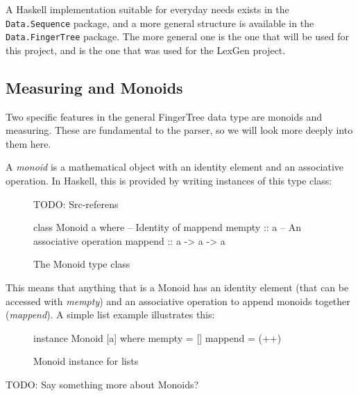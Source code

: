 \documentclass[a4paper,12pt,twosided]{report}
\begin{document}
A Haskell implementation suitable for everyday needs exists in the
\texttt{Data.Sequence} package, and a more general structure is available in the
\texttt{Data.FingerTree} package. The more general one is the one that will be
used for this project, and is the one that was used for the LexGen project.

\subsection{Measuring and Monoids}
Two specific features in the general FingerTree data type are monoids and
measuring. These are fundamental to the parser, so we will look more deeply into
them here.

A \textit{monoid} is a mathematical object with an identity element and an
associative operation. In Haskell, this is provided by writing instances of this
type class:
\begin{figure}[H]
TODO: Src-referens
\begin{code}
class Monoid a where
    -- Identity of mappend
    mempty  :: a
    -- An associative operation
    mappend :: a -> a -> a
\end{code}
\caption{The Monoid type class}
\end{figure}
This means that anything that is a Monoid has an identity element (that can be
accessed with \textit{mempty}) and an associative operation to append monoids
together (\textit{mappend}). A simple list example illustrates this:
\begin{figure}[H]
\begin{code}
instance Monoid [a] where
    mempty = []
    mappend = (++)
\end{code}
\caption{Monoid instance for lists}
\end{figure}
TODO: Say something more about Monoids?
\end{document}

